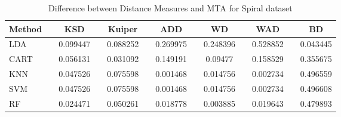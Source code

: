 \documentclass{article}
\begin{document}
\begin{table}[htbp]
  \centering
  \caption{Difference between Distance Measures and MTA for Spiral dataset}
    \begin{tabular}{lrcrcrcrcrcrc}
    \hline \hline
    Method   &          & KSD      &          & Kuiper &          & ADD      &          & WD       &          & WAD      &          & BD \\
    \hline 
    LDA      &          & 0.099447 &          & 0.088252 &          & 0.269975 &          & 0.248396 &          & 0.528852 &          & 0.043445 \\
    CART     &          & 0.056131 &          & 0.031092 &          & 0.149191 &          & 0.09477  &          & 0.158529 &          & 0.355675 \\
    KNN      &          & 0.047526 &          & 0.075598 &          & 0.001468 &          & 0.014756 &          & 0.002734 &          & 0.496559 \\
    SVM      &          & 0.047526 &          & 0.075598 &          & 0.001468 &          & 0.014756 &          & 0.002734 &          & 0.496608 \\
    RF       &          & 0.024471 &          & 0.050261 &          & 0.018778 &          & 0.003885 &          & 0.019643 &          & 0.479893 \\
    \hline \hline
    \end{tabular}\label{TB_Spiral}\end{table}
\end{document}
